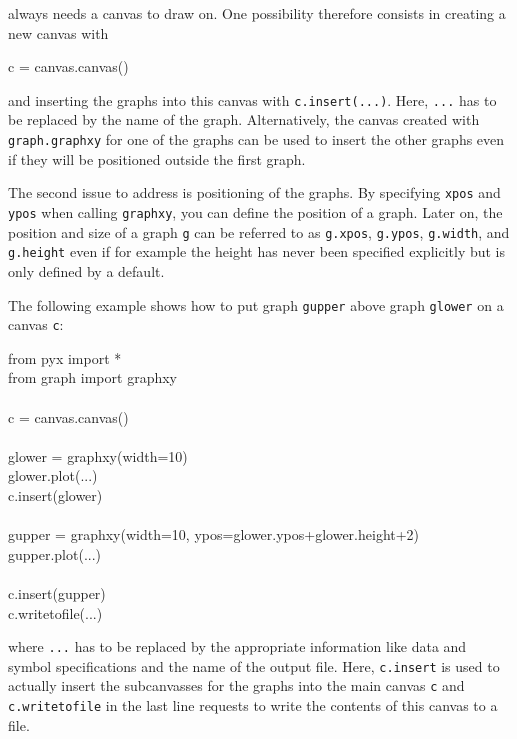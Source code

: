 \documentclass[11pt,DIV14]{scrartcl}
\begin{document}
{}
{\PyX{} always needs a canvas to draw on. One possibility therefore consists
in creating a new canvas with
\begin{progcode}
c = canvas.canvas()
\end{progcode}
and inserting the graphs into this canvas with \texttt{c.insert(...)}. Here,
\texttt{...} has to be replaced by the name of the graph. Alternatively, the
canvas created with \texttt{graph.graphxy} for one of the graphs can be used
to insert the other graphs even if they will be positioned outside the
first graph.

The second issue to address is positioning of the graphs. By specifying
\texttt{xpos} and \texttt{ypos} when calling \texttt{graphxy}, you can
define the position of a graph. Later on, the position and size of a 
graph \texttt{g} can be referred to as \texttt{g.xpos}, \texttt{g.ypos},
\texttt{g.width}, and \texttt{g.height} even if for example the height has 
never been specified explicitly but is only defined by a \PyX{} default. 

The following example shows how to put graph \texttt{gupper} above graph 
\texttt{glower} on a canvas \texttt{c}:
\begin{progcode}
from pyx import *\\
from graph import graphxy\\
\\
c = canvas.canvas()\\
\\
glower = graphxy(width=10)\\
glower.plot(...)\\
c.insert(glower)\\
\\
gupper = graphxy(width=10, ypos=glower.ypos+glower.height+2)\\
gupper.plot(...)\\
\\
c.insert(gupper)\\
c.writetofile(...)
\end{progcode}
where \texttt{...} has to be replaced by the appropriate information like
data and symbol specifications and the name of the output file. Here,
\texttt{c.insert} is used to actually insert the subcanvasses 
for the graphs into the main canvas \texttt{c} and \texttt{c.writetofile}
in the last line requests to write the contents of this canvas to a file.

%
}
\end{document}

